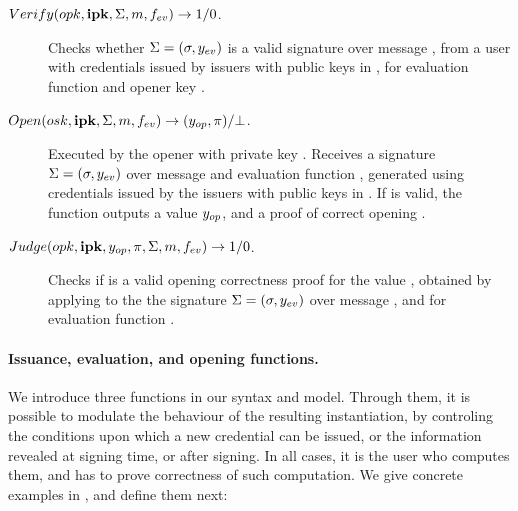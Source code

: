 \begin{description}
\item[$Verify(opk,\mathbf{ipk},\Sigma,m,f_{ev}) \rightarrow 1/0$.]
  Checks whether $\Sigma = (\sigma,y_{ev})$ is a valid signature
  over message \msg, from a user with credentials issued by issuers with public
  keys in \sipk, for evaluation function \feval and opener key \opk.
\item[$Open(osk,\mathbf{ipk},\Sigma,m,f_{ev}) \rightarrow
  (y_{op},\pi)/\bot$.]
  Executed by the opener with private key \osk. Receives a signature $\Sigma=
  (\sigma,y_{ev})$ over message \msg and evaluation function \feval,
  generated using credentials issued by the issuers with public keys in \sipk.
  If \Sig is valid, the function outputs a value $y_{op}$, and a proof of
  correct opening \iproof.
\item[$Judge(opk,\mathbf{ipk},y_{op},\pi,\Sigma,m,f_{ev}) \rightarrow 1/0$.] %
  Checks if \iproof is a valid opening correctness proof for the value \yinsp,
  obtained by applying \Open to the the signature $\Sigma = (\sigma,y_{ev})$
  over message \msg, and for evaluation function \feval. 
\end{description}

\paragraph{Issuance, evaluation, and opening functions.} %
We introduce three functions in our syntax and model. Through them,
it is possible to modulate the behaviour of the resulting instantiation, by
controling the conditions upon which a new credential can be issued, or the
information revealed at signing time, or after signing. In all cases, it is
the user who computes them, and has to prove correctness of such computation.
We give concrete examples in , and define them next:

